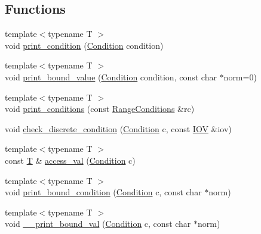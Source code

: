 \subsection*{Functions}
\begin{DoxyCompactItemize}
\item 
{\footnotesize template$<$typename T $>$ }\\void \hyperlink{namespace_d_d4hep_1_1_conditions_1_1_test_abda07299d246381a69fa136862ed0085}{print\+\_\+condition} (\hyperlink{class_d_d4hep_1_1_conditions_1_1_condition}{Condition} condition)
\item 
{\footnotesize template$<$typename T $>$ }\\void \hyperlink{namespace_d_d4hep_1_1_conditions_1_1_test_a6d29c42c2457ef64a8d01f75f015cb4e}{print\+\_\+bound\+\_\+value} (\hyperlink{class_d_d4hep_1_1_conditions_1_1_condition}{Condition} condition, const char $\ast$norm=0)
\item 
{\footnotesize template$<$typename T $>$ }\\void \hyperlink{namespace_d_d4hep_1_1_conditions_1_1_test_a961aac39e2b800da3e2cdb3027019832}{print\+\_\+conditions} (const \hyperlink{namespace_d_d4hep_1_1_conditions_ae765f0140a33973a430280f02b6062f4}{Range\+Conditions} \&rc)
\item 
void \hyperlink{namespace_d_d4hep_1_1_conditions_1_1_test_a49378cef6a8e31974f1f44b1eaf39b3a}{check\+\_\+discrete\+\_\+condition} (\hyperlink{class_d_d4hep_1_1_conditions_1_1_condition}{Condition} c, const \hyperlink{class_d_d4hep_1_1_i_o_v}{I\+OV} \&iov)
\item 
{\footnotesize template$<$typename T $>$ }\\const \hyperlink{class_t}{T} \& \hyperlink{namespace_d_d4hep_1_1_conditions_1_1_test_a3ba37d0927b4cfc9bd6e93185512de49}{access\+\_\+val} (\hyperlink{class_d_d4hep_1_1_conditions_1_1_condition}{Condition} c)
\item 
{\footnotesize template$<$typename T $>$ }\\void \hyperlink{namespace_d_d4hep_1_1_conditions_1_1_test_a584525f0624fb507254d78250d135d3d}{print\+\_\+bound\+\_\+condition} (\hyperlink{class_d_d4hep_1_1_conditions_1_1_condition}{Condition} c, const char $\ast$norm)
\item 
{\footnotesize template$<$typename T $>$ }\\void \hyperlink{namespace_d_d4hep_1_1_conditions_1_1_test_ab03a688e791c0dd4e363d9a61beb6d65}{\+\_\+\+\_\+print\+\_\+bound\+\_\+val} (\hyperlink{class_d_d4hep_1_1_conditions_1_1_condition}{Condition} c, const char $\ast$norm)

\end{DoxyCompactItemize}
